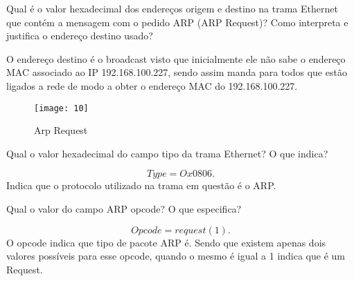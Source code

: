 \documentclass{exam}
\begin{document}
\begin{questions}
\question Qual é o valor hexadecimal dos endereços origem e destino na trama Ethernet que contém a mensagem
com o pedido ARP (ARP Request)? Como interpreta e justifica o endereço destino usado?
\begin{solution}
O endereço destino é o broadcast visto que inicialmente ele não sabe o endereço MAC associado ao IP 192.168.100.227, sendo assim manda para todos que estão ligados
a rede de modo a obter o endereço MAC do 192.168.100.227.
\end{solution}
\begin{figure}[H]
\centering\texttt{[image: 10]} 
\caption{\label{fig:controller}Arp Request}
\end{figure} 

\question Qual o valor hexadecimal do campo tipo da trama Ethernet? O que indica?
\begin{solution}
\begin{equation}
Type= Ox0806.
\end{equation}
Indica que o protocolo utilizado na trama em questão é o ARP.
\end{solution}

\question Qual o valor do campo ARP opcode? O que especifica? 
\begin{solution}
 \begin{equation}
Opcode= request (1).
\end{equation}
O opcode indica que tipo de pacote ARP é. Sendo que existem apenas dois valores possíveis para esse opcode, quando o mesmo é igual a 1 indica que é um Request.
\end{solution}


\end{questions}
\end{document}
